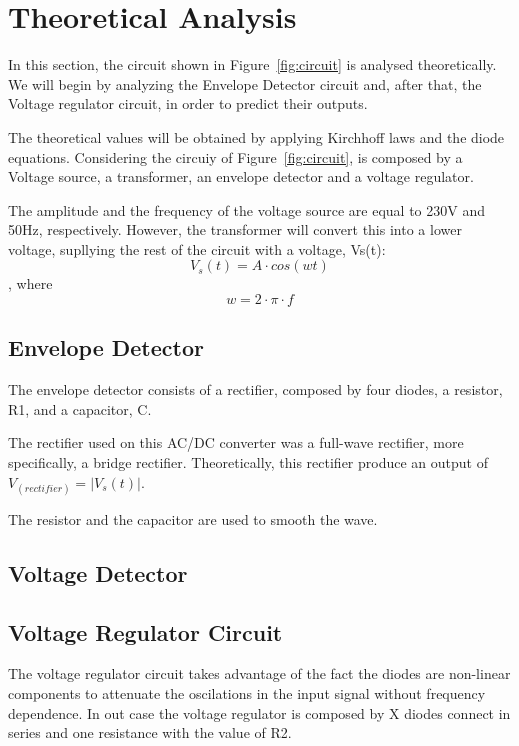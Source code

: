 \section{Theoretical Analysis}
\label{sec:analysis}

In this section, the circuit shown in Figure~\ref{fig:circuit} is analysed
theoretically. We will begin by analyzing the Envelope Detector circuit and, after that, the Voltage regulator circuit, in order to predict their outputs.

The theoretical values will be obtained by applying Kirchhoff laws and the diode equations.
Considering the circuiy of Figure~\ref{fig:circuit}, is composed by a Voltage source, a transformer, an envelope detector and a voltage regulator.

The amplitude and the frequency of the voltage source are equal to 230V and 50Hz, respectively. However, the transformer will convert this into a lower voltage, supllying the rest of the circuit with a voltage, Vs(t):
\begin{equation}
  V_s(t)= A \cdot cos(wt)
  \label{eq:Vs(t)}
\end{equation}
, where
\begin{equation}
  w= 2 \cdot \pi \cdot f
  \label{eq:Vs(t)}
\end{equation}

\subsection{Envelope Detector}
The envelope detector consists of a rectifier, composed by four diodes, a resistor, R1, and a capacitor, C.

The rectifier used on this AC/DC converter was a full-wave rectifier, more specifically, a bridge rectifier. Theoretically, this rectifier produce an output of $V_(rectifier)=|V_s(t)|$.

The resistor and the capacitor are used to smooth the wave.


\subsection{Voltage Detector}

\subsection{Voltage Regulator Circuit}
The voltage regulator circuit takes advantage of the fact the diodes are non-linear components to attenuate the oscilations in the input signal without frequency dependence. In out case the voltage regulator is composed by X diodes connect in series and one resistance with the value of R2.\\

